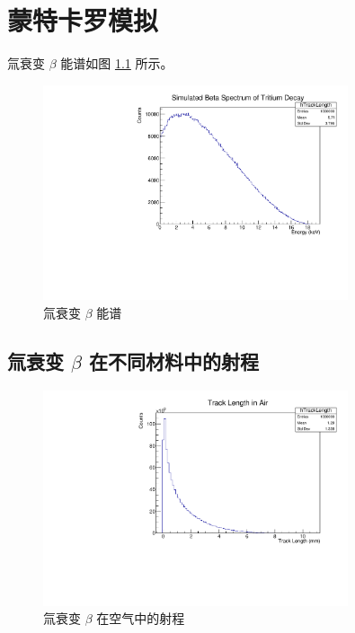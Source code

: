 
\chapter{蒙特卡罗模拟}
\label{chap:Simulation}

氚衰变 $\beta$ 能谱如图 \ref{fig:eSpectrum} 所示。

\begin{figure}[htbp]
	\centering
	\includegraphics[width=0.8\textwidth]{figures/eSpectrum.pdf}
	\caption{氚衰变 $\beta$ 能谱}
	\label{fig:eSpectrum}
\end{figure}

\section{氚衰变 $\beta$ 在不同材料中的射程}

\begin{figure}[htbp]
	\centering
	\includegraphics[width=0.8\textwidth]{figures/AirTrackLength.pdf}
	\caption{氚衰变 $\beta$ 在空气中的射程}
	\label{fig:AirTrackLength}
\end{figure}

